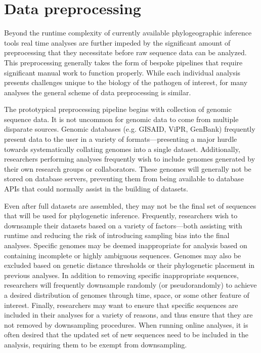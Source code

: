 \section{Data preprocessing}

Beyond the runtime complexity of currently available phylogeographic inference tools real time analyses are further impeded by the significant amount of preprocessing that they necessitate before raw sequence data can be analyzed.
This preprocessing generally takes the form of bespoke pipelines that require significant manual work to function properly.
While each individual analysis presents challenges unique to the biology of the pathogen of interest, for many analyses the general scheme of data preprocessing is similar.

The prototypical preprocessing pipeline begins with collection of genomic sequence data.
It is not uncommon for genomic data to come from multiple disparate sources.
Genomic databases (e.g. GISAID, ViPR, GenBank) frequently present data to the user in a variety of formats---presenting a major hurdle towards systematically collating genomes into a single dataset.
Additionally, researchers performing analyses frequently wish to include genomes generated by their own research groups or collaborators.
These genomes will generally not be stored on database servers, preventing them from being available to database APIs that could normally assist in the building of datasets.

Even after full datasets are assembled, they may not be the final set of sequences that will be used for phylogenetic inference.
Frequently, researchers wish to downsample their datasets based on a variety of factors---both assisting with runtime and reducing the risk of introducing sampling bias into the final analyses.
Specific genomes may be deemed inappropriate for analysis based on containing incomplete or highly ambiguous sequences.
Genomes may also be excluded based on genetic distance thresholds or their phylogenetic placement in previous analyses.
In addition to removing specific inappropriate sequences, researchers will frequently downsample randomly (or pseudorandomly) to achieve a desired distribution of genomes through time, space, or some other feature of interest.
Finally, researchers may want to ensure that specific sequences are included in their analyses for a variety of reasons, and thus ensure that they are not removed by downsampling procedures.
When running online analyses, it is often desired that the updated set of new sequences need to be included in the analysis, requiring them to be exempt from downsampling.


